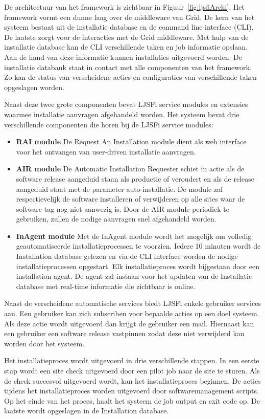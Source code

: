 De architectuur van het framework is zichtbaar in Figuur~\ref{fig:ljsfiArchi}.
Het framework vormt een dunne laag over de middleware van Grid.
De kern van het systeem bestaat uit de installatie database en de command line interface (CLI).
De laatste zorgt voor de interacties met de Grid middleware.
Met hulp van de installatie database kan de CLI verschillende taken en job informatie opslaan.
Aan de hand van deze informatie kunnen installaties uitgevoerd worden.
De installatie databank staat in contact met alle componenten van het framework.
Zo kan de status van verscheidene acties en configuraties van verschillende taken opgeslagen worden.

Naast deze twee grote componenten bevat LJSFi service modules en extensies waarmee installatie aanvragen afgehandeld worden.
Het systeem bevat drie verschillende componenten die horen bij de LJSFi service modules:
\begin{itemize}
\item \textbf{RAI module} De Request An Installation module dient als web interface voor het ontvangen van user-driven installatie aanvragen.
\item \textbf{AIR module} De Automatic Installation Requester schiet in actie als de software release aangeduid staan als productie of veroudert en als de release aangeduid staat met de parameter auto-installatie.
De module zal respectievelijk de software installeren of verwijderen op alle sites waar de software tag nog niet aanwezig is.
Door de AIR module periodiek te gebruiken, zullen de nodige aanvragen snel afgehandeld worden.
\item \textbf{InAgent module} Met de InAgent module wordt het mogelijk om volledig geautomatiseerde installatieprocessen te voorzien.
Iedere 10 minuten wordt de Installation database gelezen en via de CLI interface worden de nodige installatieprocessen opgestart.
Elk installatieproces wordt bijgestaan door een installation agent.
De agent zal instaan voor het updaten van de Installatie database met real-time informatie die zichtbaar is online.
\end{itemize}

Naast de verscheidene automatische services biedt LJSFi enkele gebruiker services aan.
Een gebruiker kan zich subscriben voor bepaalde acties op een doel systeem.
Als deze actie wordt uitgevoerd dan krijgt de gebruiker een mail.
Hiernaast kan een gebruiker een software release vastpinnen zodat deze niet verwijderd kan worden door het systeem.

Het installatieproces wordt uitgevoerd in drie verschillende stappen.
In een eerste stap wordt een site check uitgevoerd door een pilot job naar de site te sturen.
Als de check succesvol uitgevoerd wordt, kan het installatieproces beginnen.
De acties tijdens het installatieproces worden uitgevoerd door softwaremanagement scripts.
Op het einde van het proces, haalt het systeem de job output en exit code op.
De laatste wordt opgeslagen in de Installation database.


